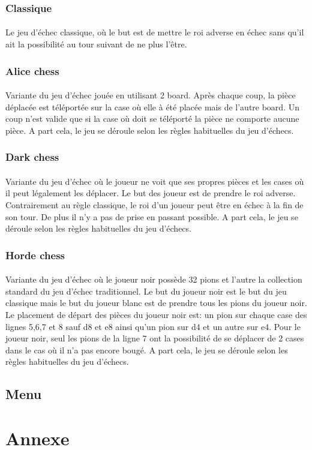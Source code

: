 \documentclass[10pt, a4paper]{article}
\begin{document}
\subsubsection{Classique}
\paragraph{}Le jeu d'échec classique, où le but est de mettre le roi adverse en échec sans qu'il ait la possibilité au tour suivant de ne plus l'être.
\subsubsection{Alice chess}
\paragraph{}Variante du jeu d'échec jouée en utilisant 2 board. Après chaque coup, la pièce déplacée est téléportée sur la case où elle à été placée mais de l'autre board. Un coup n'est valide que si la case où doit se téléporté la pièce ne comporte aucune pièce. A part cela, le jeu se déroule selon les règles habituelles du jeu d'échecs.
\subsubsection{Dark chess}
\paragraph{}Variante du jeu d'échec où le joueur ne voit que ses propres pièces et les cases où il peut légalement les déplacer. Le but des joueur est de prendre le roi adverse. Contrairement au règle classique, le roi d'un joueur peut être en échec à la fin de son tour. De plus il n'y a pas de prise en passant possible. A part cela, le jeu se déroule selon les règles habituelles du jeu d'échecs.

\subsubsection{Horde chess}
\paragraph{} Variante du jeu d'échec où le joueur noir possède 32 pions et l'autre la collection standard du jeu d'échec traditionnel. Le but du joueur noir est le but du jeu classique mais le but du joueur blanc est de prendre tous les pions du joueur noir. Le placement de départ des pièces du joueur noir est: un pion sur chaque case des lignes 5,6,7 et 8 sauf d8 et e8 ainsi qu'un pion sur d4 et un autre sur e4. Pour le joueur noir, seul les pions de la ligne 7 ont la possibilité de se déplacer de 2 cases dans le cas où il n'a pas encore bougé. A part cela, le jeu se déroule selon les règles habituelles du jeu d'échecs.
		
\subsection{Menu}
		
\section{Annexe}
	
	
		
		
		
		
\end{document}
